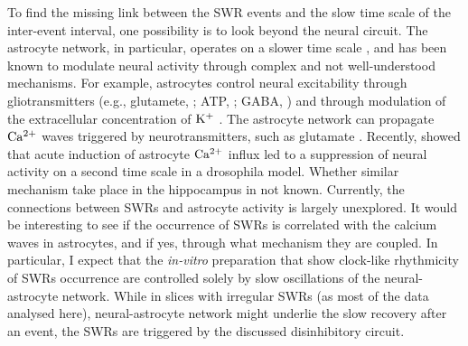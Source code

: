     To find the missing link between the SWR events and the slow time scale of
    the inter-event interval, one possibility is to look beyond the neural
    circuit. The astrocyte network, in particular, operates on a slower time
    scale \cite[$\sim 500 \,\rm ms$,][]{Sasaki2014}, and has been known to
    modulate neural activity through complex and not well-understood
    mechanisms. For example, astrocytes control neural excitability through
    gliotransmitters (e.g., glutamete, \citealp{Parpura1994}; ATP,
    \citealp{Newman2001}; GABA, \citealp{Liu2000}) and through modulation of
    the extracellular concentration of $\rm K^+$ \citep{Wang2012}. The
    astrocyte network can propagate $\rm Ca^{2+}$ waves triggered by
    neurotransmitters, such as glutamate \citep[e.g.,][]{Cornell1990}.
    Recently, \cite{Zhang2017} showed that acute induction of astrocyte $\rm
    Ca^{2+}$ influx led to a suppression of neural activity on a second time
    scale in a drosophila model. Whether similar mechanism take place in the
    hippocampus in not known. Currently, the connections between SWRs and
    astrocyte activity is largely unexplored.  It would be interesting to see
    if the occurrence of SWRs is correlated with the calcium waves in
    astrocytes, and if yes, through what mechanism they are coupled. In
    particular, I expect that the \textit{in-vitro} preparation that show
    clock-like rhythmicity of SWRs occurrence are controlled solely by slow
    oscillations of the neural-astrocyte network. While in slices with
    irregular SWRs (as most of the data analysed here), neural-astrocyte
    network might underlie the slow recovery after an event, the SWRs are
    triggered by the discussed disinhibitory circuit.
    
    \begin{comment}
    $\rm Na^+$, $\rm Ca^{2+}$, 
    An alternative extra-neuronal circuit mightjka...2,3 general sentences!! glia, astro
    calcium, potassium, glutamate, adenosize (felin2006)

    astrocites controlling extrasynaptic Ca+2, can this be another slow variable
    for the iSWi??  Aivar2014: extracellular calcium controls the type of events: SW or epileptic bursts, their size etc.
    Sasaki2014: astrocyte calcium signalling modulates the extrasynaptic calcium and also the neural synchronisation
    is incidence correlated with the speed of perfusion??
    excess or insufficient resources suppress SWRs
    pefusion: if excess then increasing perfusion will smear it out, increases SWRs
            if insufficient: then slowing down the perfusion, will help build up and increase SWs
    sasaki2008: decay of calcium transients sim to 500ms; 400-600 ms
    would be cool to check if SWs coincide with astrocyte spikes

    especially in the slice models that show regular SWRs

    King2001: extrasynaptic Ca as control for STD
    also potassium;...
    \end{comment}

